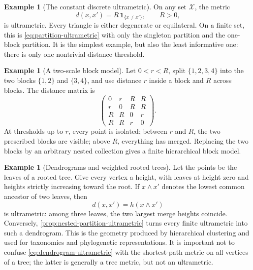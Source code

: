 \documentclass[11pt,a4paper]{article}
\theoremstyle{definition}
\newtheorem{example}[theorem]{Example}
\theoremstyle{remark}
\begin{document}
\begin{example}[The constant discrete ultrametric]
\label{ex:constant-ultrametric}
On any set \(\mathcal X\), the metric
\[
  d(x,x')=R\,\mathbf 1_{\{x\neq x'\}},\qquad R>0,
\]
is ultrametric.  Every triangle is either degenerate or equilateral.  On a
finite set, this is \eqref{eq:partition-ultrametric} with only the singleton
partition and the one-block partition.  It is the simplest example, but also
the least informative one: there is only one nontrivial distance threshold.
\end{example}

\begin{example}[A two-scale block model]
\label{ex:two-scale-ultrametric}
Let \(0<r<R\), split \(\{1,2,3,4\}\) into the two blocks
\(\{1,2\}\) and \(\{3,4\}\), and use distance \(r\) inside a block and
\(R\) across blocks.  The distance matrix is
\[
  \begin{pmatrix}
    0&r&R&R\\
    r&0&R&R\\
    R&R&0&r\\
    R&R&r&0
  \end{pmatrix}.
\]
At thresholds up to \(r\), every point is isolated; between \(r\) and \(R\),
the two prescribed blocks are visible; above \(R\), everything has merged.
Replacing the two blocks by an arbitrary nested collection gives a finite
hierarchical block model.
\end{example}

\begin{example}[Dendrograms and weighted rooted trees]
\label{ex:dendrogram-ultrametric}
Let the points be the leaves of a rooted tree.  Give every vertex a height,
with leaves at height zero and heights strictly increasing toward the root.
If \(x\wedge x'\) denotes the lowest common ancestor of two leaves, then
\begin{equation}
  d(x,x')=h(x\wedge x')
  \label{eq:dendrogram-ultrametric}
\end{equation}
is ultrametric: among three leaves, the two largest merge heights coincide.
Conversely, \cref{prop:nested-partition-ultrametric} turns every finite
ultrametric into such a dendrogram.  This is the geometry produced by
hierarchical clustering and used for taxonomies and phylogenetic
representations.  It is important not to confuse \eqref{eq:dendrogram-ultrametric}
with the shortest-path metric on all vertices of a tree; the latter is
generally a tree metric, but not an ultrametric.
\end{example}
\end{document}
